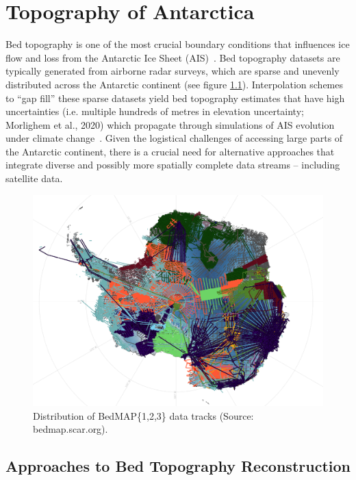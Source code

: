 \chapter{Topography of Antarctica}\label{review}

Bed topography is one of the most crucial boundary conditions that influences ice flow and loss from the Antarctic Ice Sheet (AIS)~\cite{Morlighem_2020}. Bed topography datasets are typically generated from airborne radar surveys, which are sparse and unevenly distributed across the Antarctic continent (see figure \ref{fig:BedMAP}). Interpolation schemes to ``gap fill'' these sparse datasets yield bed topography estimates that have high uncertainties (i.e. multiple hundreds of metres in elevation uncertainty; Morlighem et al., 2020) which propagate through simulations of AIS evolution under climate change~\cite{Castleman_2022}. Given the logistical challenges of accessing large parts of the Antarctic continent, there is a crucial need for alternative approaches that integrate diverse and possibly more spatially complete data streams – including satellite data.
\begin{figure}[H] %
    \includegraphics[scale=0.38]{bedmap.png}
    \caption{Distribution of BedMAP\{1,2,3\} data tracks (Source: bedmap.scar.org).}
    \label{fig:BedMAP}
\end{figure}

\section{Approaches to Bed Topography Reconstruction}

